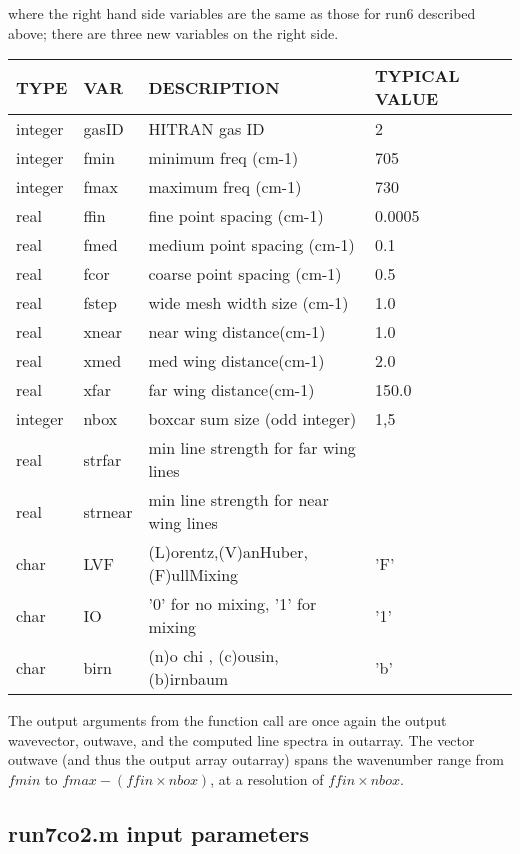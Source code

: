 \documentclass[11pt]{article}
\begin{document}
where the right hand side variables are the same as those for run6 
described above; there are three new variables on the right side.

\begin{longtable}{llll}
\hline
\hline
  TYPE  &   VAR  &         DESCRIPTION  &            TYPICAL VALUE\\
\hline
\hline
integer & gasID  &       HITRAN gas ID      &            2\\
\hline
integer & fmin    &      minimum freq (cm-1) &          705\\
integer & fmax    &      maximum freq (cm-1) &          730\\
\hline
real   &  ffin    &      fine point spacing (cm-1) &    0.0005\\
real   &  fmed    &      medium point spacing (cm-1)&   0.1\\
real   &  fcor    &      coarse point spacing (cm-1)  & 0.5\\
\hline
real   &  fstep   &      wide mesh width size (cm-1) &    1.0\\
real   &  xnear   &      near wing distance(cm-1)    &    1.0\\
real   &  xmed    &      med wing distance(cm-1)     &    2.0\\
real   &  xfar    &      far wing distance(cm-1)     &    150.0\\
\hline
integer & nbox     &     boxcar sum size (odd integer) &  1,5\\
\hline
real   &  strfar   &    min line strength for far wing lines & \\
real   &  strnear  &    min line strength for near wing lines& \\
\hline
char   &  LVF       &    (L)orentz,(V)anHuber,(F)ullMixing &  'F'\\
char   &  IO        &    '0' for no mixing, '1' for mixing &  '1'\\
char   &  birn      &    (n)o chi , (c)ousin, (b)irnbaum   &  'b'\\
\hline
\hline
\end{longtable}

The output arguments from the function call are once again the output 
wavevector, 
outwave, and the computed line spectra in outarray. The vector outwave (and 
thus the output array outarray) spans the wavenumber range from $fmin$ to 
$fmax-(ffin \times  nbox)$, at a resolution of $ffin \times nbox$.

\subsection{run7co2.m input parameters}
\end{document}
